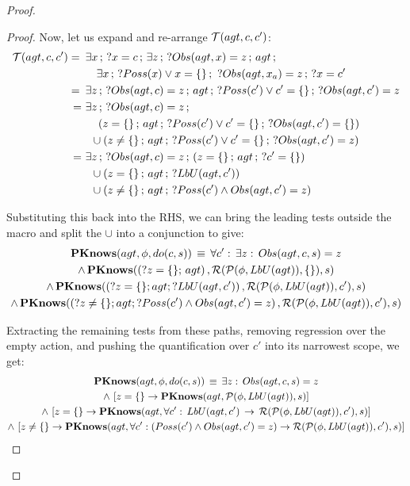 \begin{proof}
\begin{ned}
\begin{proof}
Now, let us expand and re-arrange $\mathcal{T}(agt,c,c')$:\begin{align*}
\mathcal{T}(agt,c,c')=\,\,\, & \exists x\,;\,?x=c\,;\,\exists z\,;\,?Obs(agt,x)=z\,;\, agt\,;\\
 & \,\,\,\,\,\,\exists x\,;\,?Poss(x)\vee x=\{\}\,;\,\,?Obs(agt,x_{a})=z\,;\,?x=c'\\
=\,\,\, & \exists z\,;\,?Obs(agt,c)=z\,;\, agt\,;\,?Poss(c')\vee c'=\{\}\,;\,?Obs(agt,c')=z\\
=\,\, & \exists z\,;\,?Obs(agt,c)=z\,;\\
 & \,\,\,\,\,\,\left(z=\{\}\,;\, agt\,;\,?Poss(c')\vee c'=\{\}\,;\,?Obs(agt,c')=\{\}\right)\\
 & \,\,\,\cup\left(z\neq\{\}\,;\, agt\,;\,?Poss(c')\vee c'=\{\}\,;\,?Obs(agt,c')=z\right)\\
=\,\, & \exists z\,;\,?Obs(agt,c)=z\,;\,\left(z=\{\}\,;\, agt\,;\,?c'=\{\}\right)\\
 & \,\,\,\cup\left(z=\{\}\,;\, agt\,;\,?LbU(agt,c')\right)\\
 & \,\,\,\cup\left(z\neq\{\}\,;\, agt\,;\,?Poss(c')\wedge Obs(agt,c')=z\right)\end{align*}


Substituting this back into the RHS, we can bring the leading tests
outside the macro and split the $\cup$ into a conjunction to give:\begin{multline*}
\mathbf{PKnows}(agt,\phi,do(c,s))\,\equiv\,\forall c':\,\exists z:\, Obs(agt,c,s)=z\\
\wedge\,\mathbf{PKnows}(\left(?z=\{\};\, agt\right),\mathcal{R}(\mathcal{P}(\phi,LbU(agt)),\{\}),s)\\
\wedge\,\mathbf{PKnows}(\left(?z=\{\};agt;?LbU(agt,c')\right),\mathcal{R}(\mathcal{P}(\phi,LbU(agt)),c'),s)\\
\wedge\,\mathbf{PKnows}(\left(?z\neq\{\};agt;?Poss(c')\wedge Obs(agt,c')=z\right),\mathcal{R}(\mathcal{P}(\phi,LbU(agt)),c'),s)\end{multline*}


Extracting the remaining tests from these paths, removing regression
over the empty action, and pushing the quantification over $c'$ into
its narrowest scope, we get:\begin{multline*}
\mathbf{PKnows}(agt,\phi,do(c,s))\,\equiv\,\exists z:\, Obs(agt,c,s)=z\\
\wedge\,\left[z=\{\}\rightarrow\mathbf{PKnows}(agt,\mathcal{P}(\phi,LbU(agt)),s)\right]\\
\wedge\,\left[z=\{\}\rightarrow\mathbf{PKnows}(agt,\forall c':\, LbU(agt,c')\,\rightarrow\,\mathcal{R}(\mathcal{P}(\phi,LbU(agt)),c'),s)\right]\\
\wedge\,\left[z\neq\{\}\rightarrow\mathbf{PKnows}(agt,\forall c':\left(Poss(c')\wedge Obs(agt,c')=z\right)\rightarrow\mathcal{R}(\mathcal{P}(\phi,LbU(agt)),c'),s)\right]\end{multline*}



\end{proof}
\end{ned}
\end{proof}
